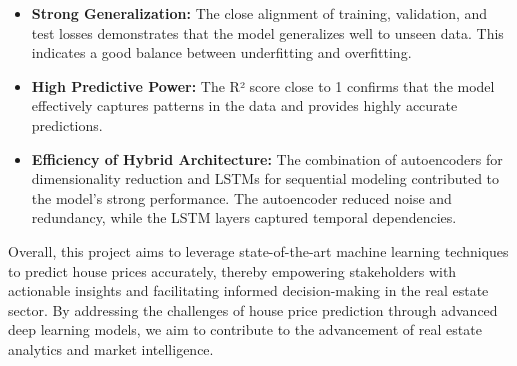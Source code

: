 \begin{itemize}
    \item \textbf{Strong Generalization:} The close alignment of training, validation, and test losses demonstrates that the model generalizes well to unseen data. This indicates a good balance between underfitting and overfitting.
    \item \textbf{High Predictive Power:} The R² score close to 1 confirms that the model effectively captures patterns in the data and provides highly accurate predictions.
    \item \textbf{Efficiency of Hybrid Architecture:} The combination of autoencoders for dimensionality reduction and LSTMs for sequential modeling contributed to the model's strong performance. The autoencoder reduced noise and redundancy, while the LSTM layers captured temporal dependencies.
\end{itemize}

Overall, this project aims to leverage state-of-the-art machine learning techniques to predict house prices accurately, thereby empowering stakeholders with actionable insights and facilitating informed decision-making in the real estate sector. By addressing the challenges of house price prediction through advanced deep learning models, we aim to contribute to the advancement of real estate analytics and market intelligence.